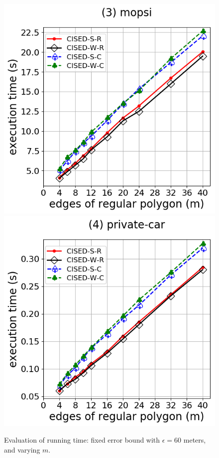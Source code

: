 {\begin{figure}[tb!]
	\includegraphics[scale = 0.290]{Figures/Exp-M-e-60-time-mopsi.png}\hspace{1ex}
	\includegraphics[scale = 0.290]{Figures/Exp-M-e-60-time-private.png}
	\caption{\small Evaluation of running time: fixed error bound with $\epsilon=60$ meters, and varying $m$. }
	\label{fig:m-time-e60}
\end{figure}





}
